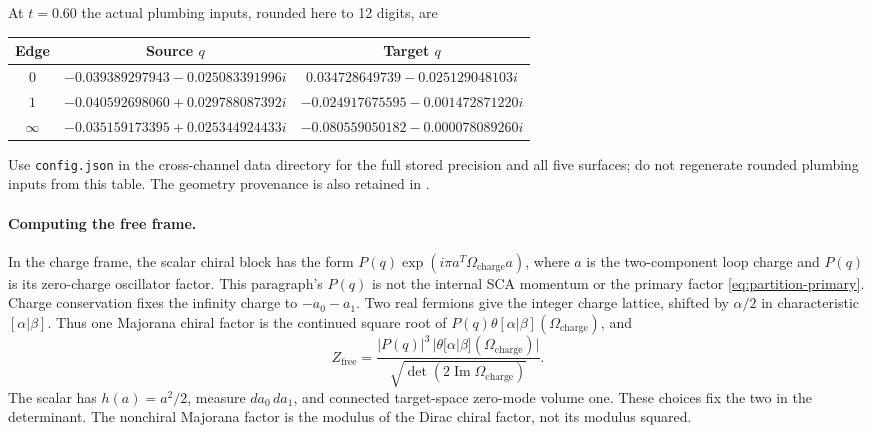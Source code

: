 At $t=0.60$ the actual plumbing inputs, rounded here to 12 digits,
are
\begin{center}
\begin{tabular}{ccc}
\toprule
Edge & Source $q$ & Target $q$\\
\midrule
$0$ & $-0.039389297943-0.025083391996i$
    & $ 0.034728649739-0.025129048103i$\\
$1$ & $-0.040592698060+0.029788087392i$
    & $-0.024917675595-0.001472871220i$\\
$\infty$ & $-0.035159173395+0.025344924433i$
    & $-0.080559050182-0.000078089260i$\\
\bottomrule
\end{tabular}
\end{center}
Use \texttt{config.json} in the cross-channel data directory for
the full stored precision and all five surfaces; do not regenerate
rounded plumbing inputs from this table. The geometry provenance is
also retained in
.

\paragraph{Computing the free frame.}
In the charge frame, the scalar chiral block has the form
$P(q)\exp(i\pi a^T\Omega_{\mathrm{charge}}a)$, where $a$ is
the two-component loop charge and $P(q)$ is its zero-charge
oscillator factor. This paragraph's $P(q)$ is not the internal
SCA momentum or the primary factor \eqref{eq:partition-primary}.
Charge conservation fixes the infinity charge to $-a_0-a_1$.
Two real fermions give the integer charge lattice, shifted by
$\alpha/2$ in characteristic $[\alpha|\beta]$. Thus one
Majorana chiral factor is the continued square root of
$P(q)\theta[\alpha|\beta](\Omega_{\mathrm{charge}})$, and
\begin{equation}
 Z_{\mathrm{free}}=
 \frac{|P(q)|^3\,|\theta[\alpha|\beta](\Omega_{\mathrm{charge}})|}
      {\sqrt{\det(2\operatorname{Im}\Omega_{\mathrm{charge}})}}.
 \label{eq:partition-free}
\end{equation}
The scalar has $h(a)=a^2/2$, measure $da_0\,da_1$, and connected
target-space zero-mode volume one. These choices fix the two in
the determinant. The nonchiral Majorana factor is the modulus
of the Dirac chiral factor, not its modulus squared.

